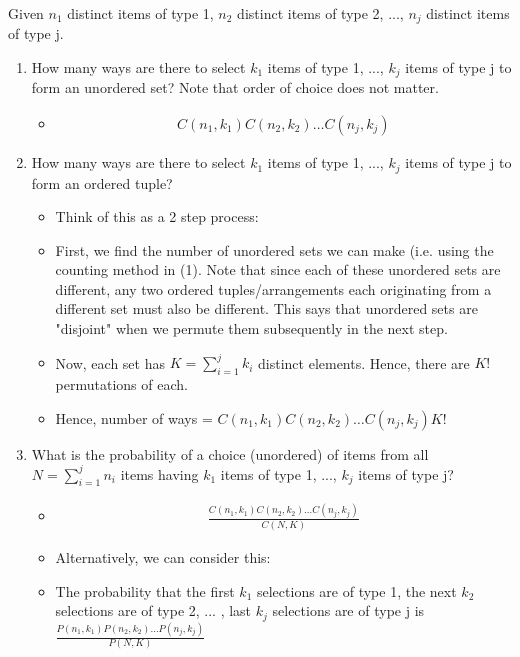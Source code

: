 \documentclass{article}
\begin{document}
\subsubsection{}
Given $n_1$ distinct items of type 1, $n_2$ distinct items of type 2, ..., $n_j$ distinct items of type j.
\begin{enumerate}
    \item How many ways are there to select $k_1$ items of type 1, ..., $k_j$ items of type j to form an unordered set? Note that order of choice does not matter.
    \begin{itemize}
        \item \begin{align*}
            C(n_1, k_1)  C(n_2, k_2) \dots  C(n_j, k_j)
        \end{align*}
    \end{itemize}
    \item How many ways are there to select $k_1$ items of type 1, ..., $k_j$ items of type j to form an ordered tuple?
    \begin{itemize}
        \item Think of this as a 2 step process:
        \item First, we find the number of unordered sets we can make (i.e. using the counting method in (1). Note that since each of these unordered sets are different, any two ordered tuples/arrangements each originating from a different set must also be different. This says that unordered sets are "disjoint" when we permute them subsequently in the next step.
        \item Now, each set has $K=\sum_{i=1}^j k_i$ distinct elements. Hence, there are $K!$ permutations of each.
        \item Hence, number of ways = $C(n_1, k_1)  C(n_2, k_2) \dots  C(n_j, k_j)K!$
    \end{itemize}
    \item What is the probability of a choice (unordered) of items from all $N=\sum_{i=1}^j n_i$ items having $k_1$ items of type 1, ..., $k_j$ items of type j?
    \begin{itemize}
        \item \begin{align*}
            \frac{C(n_1, k_1)  C(n_2, k_2) \dots  C(n_j, k_j)}{C(N, K)}
        \end{align*}
        \item Alternatively, we can consider this:
        \item The probability that the first $k_1$ selections are of type 1, the next $k_2$ selections are of type 2, ... , last $k_j$ selections are of type j is $\frac{P(n_1,k_1)P(n_2,k_2)\dots P(n_j,k_j)}{P(N,K)}$

\end{itemize}
\end{enumerate}
\end{document}
